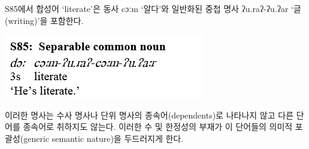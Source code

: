 S85에서 합성어 `literate'은 동사 cɔːm `알다'와 일반화된 중첩 명사 ʔu.raʔ-ʔu.ʔar `글(writing)'을 포함한다.

\includegraphics{Pacoh/src/PacohS85.png}

이러한 명사는 수사 명사나 단위 명사의 종속어(dependents)로 나타나지 않고 다른 단어를 종속어로 취하지도 않는다. 이러한 수 및 한정성의 부재가 이 단어들의 의미적 포괄성(generic semantic nature)을 두드러지게 한다.